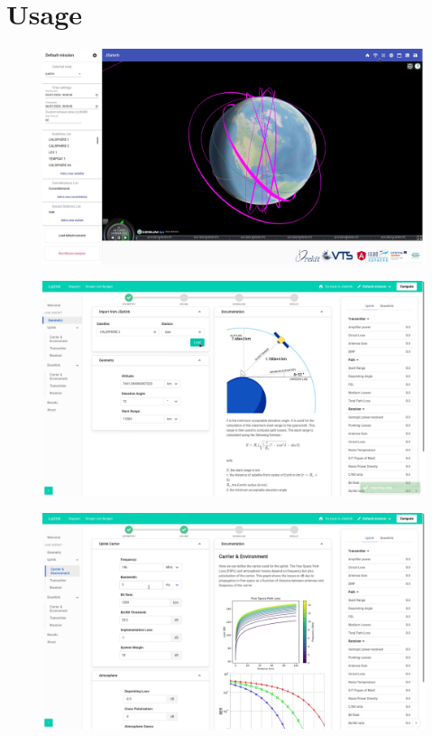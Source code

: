 \documentclass{beamer}
\begin{document}
\section{Usage}
\begin{frame}
	\begin{figure}
		\includegraphics[width=1\textwidth]{1.png}
	\end{figure}
\end{frame}
\begin{frame}
	\begin{figure}
		\includegraphics[width=1\textwidth]{2.png}
	\end{figure}
\end{frame}
\begin{frame}
	\begin{figure}
		\includegraphics[width=1\textwidth]{3.png}
	\end{figure}
\end{frame}
\end{document}
